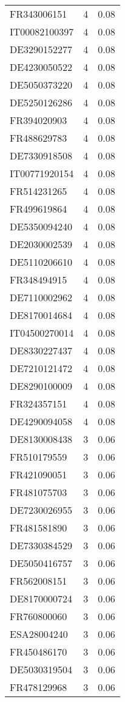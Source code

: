 \begin{table*}[htbp]
\begin{tabular}{lrr}
FR343006151 & 4 & 0.08 \\
IT00082100397 & 4 & 0.08 \\
DE3290152277 & 4 & 0.08 \\
DE4230050522 & 4 & 0.08 \\
DE5050373220 & 4 & 0.08 \\
DE5250126286 & 4 & 0.08 \\
FR394020903 & 4 & 0.08 \\
FR488629783 & 4 & 0.08 \\
DE7330918508 & 4 & 0.08 \\
IT00771920154 & 4 & 0.08 \\
FR514231265 & 4 & 0.08 \\
FR499619864 & 4 & 0.08 \\
DE5350094240 & 4 & 0.08 \\
DE2030002539 & 4 & 0.08 \\
DE5110206610 & 4 & 0.08 \\
FR348494915 & 4 & 0.08 \\
DE7110002962 & 4 & 0.08 \\
DE8170014684 & 4 & 0.08 \\
IT04500270014 & 4 & 0.08 \\
DE8330227437 & 4 & 0.08 \\
DE7210121472 & 4 & 0.08 \\
DE8290100009 & 4 & 0.08 \\
FR324357151 & 4 & 0.08 \\
DE4290094058 & 4 & 0.08 \\
DE8130008438 & 3 & 0.06 \\
FR510179559 & 3 & 0.06 \\
FR421090051 & 3 & 0.06 \\
FR481075703 & 3 & 0.06 \\
DE7230026955 & 3 & 0.06 \\
FR481581890 & 3 & 0.06 \\
DE7330384529 & 3 & 0.06 \\
DE5050416757 & 3 & 0.06 \\
FR562008151 & 3 & 0.06 \\
DE8170000724 & 3 & 0.06 \\
FR760800060 & 3 & 0.06 \\
ESA28004240 & 3 & 0.06 \\
FR450486170 & 3 & 0.06 \\
DE5030319504 & 3 & 0.06 \\
FR478129968 & 3 & 0.06 \\

\end{tabular}
\end{table*}
